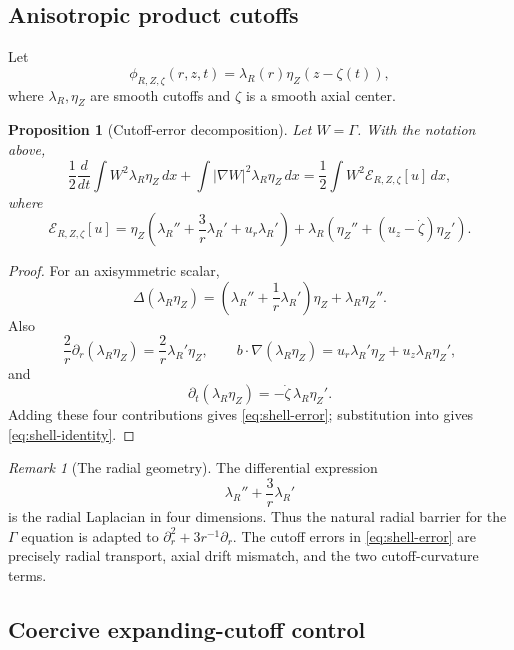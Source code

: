 \documentclass[11pt]{amsart}
\theoremstyle{plain}
\newtheorem{proposition}[theorem]{Proposition}
\theoremstyle{definition}
\theoremstyle{remark}
\newtheorem{remark}[theorem]{Remark}
\numberwithin{equation}{section}
\begin{document}
\subsection{Anisotropic product cutoffs}

Let
\[
   \phi_{R,Z,\zeta}(r,z,t)=\lambda_R(r)\eta_Z(z-\zeta(t)),
\]
where \(\lambda_R,\eta_Z\) are smooth cutoffs and \(\zeta\) is a smooth axial
center.

\begin{proposition}[Cutoff-error decomposition]\label{prop:shell}
Let \(W=\Gamma\).  With the notation above,
\begin{equation}\label{eq:shell-identity}
   \frac12\frac{d}{dt}\int W^2\lambda_R\eta_Z\,dx
   +
   \int|\nabla W|^2\lambda_R\eta_Z\,dx
   =
   \frac12\int W^2\mathcal E_{R,Z,\zeta}[u]\,dx,
\end{equation}
where
\begin{equation}\label{eq:shell-error}
   \mathcal E_{R,Z,\zeta}[u]
   =
   \eta_Z\left(
      \lambda_R''+\frac3r\lambda_R'+u_r\lambda_R'
   \right)
   +
   \lambda_R\left(
      \eta_Z''+(u_z-\dot\zeta)\eta_Z'
   \right).
\end{equation}
\end{proposition}

\begin{proof}
For an axisymmetric scalar,
\[
   \Delta(\lambda_R\eta_Z)
   =
   \left(\lambda_R''+\frac1r\lambda_R'\right)\eta_Z
   +
   \lambda_R\eta_Z'' .
\]
Also
\[
   \frac2r\partial_r(\lambda_R\eta_Z)
   =
   \frac2r\lambda_R'\eta_Z,\qquad
   b\cdot\nabla(\lambda_R\eta_Z)
   =
   u_r\lambda_R'\eta_Z+u_z\lambda_R\eta_Z',
\]
and
\[
   \partial_t(\lambda_R\eta_Z)
   =
   -\dot\zeta\,\lambda_R\eta_Z'.
\]
Adding these four contributions gives \eqref{eq:shell-error}; substitution
into  gives \eqref{eq:shell-identity}.
\end{proof}

\begin{remark}[The radial geometry]
The differential expression
\[
   \lambda_R''+\frac3r\lambda_R'
\]
is the radial Laplacian in four dimensions.  Thus the natural radial barrier
for the \(\Gamma\) equation is adapted to
\(\partial_r^2+3r^{-1}\partial_r\).  The cutoff errors in
\eqref{eq:shell-error} are precisely radial transport, axial drift mismatch,
and the two cutoff-curvature terms.
\end{remark}

\subsection{Coercive expanding-cutoff control}
\end{document}
